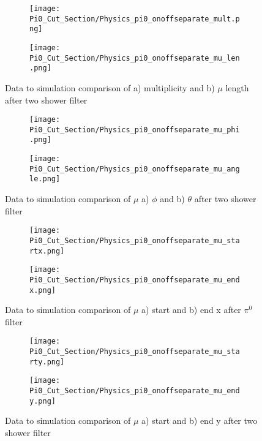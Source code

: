 \begin{figure}[H]
  \begin{subfigure}[t]{0.3\textwidth}
\texttt{[image: Pi0\_Cut\_Section/Physics\_pi0\_onoffseparate\_mult.png]}
  \caption{ }
  \end{subfigure} 
  \hspace{34mm}
  \begin{subfigure}[t]{0.3\textwidth}
    \texttt{[image: Pi0\_Cut\_Section/Physics\_pi0\_onoffseparate\_mu\_len.png]}
  \caption{ }
  \end{subfigure} 
  \caption{ Data to simulation comparison of a) multiplicity and b) $\mu$ length after two shower filter }
\label{fig:physics_pi0_mu_len}
\end{figure}

\begin{figure}[H]
  \begin{subfigure}[t]{0.3\textwidth}
\texttt{[image: Pi0\_Cut\_Section/Physics\_pi0\_onoffseparate\_mu\_phi.png]}
  \caption{ }
  \end{subfigure} 
  \hspace{34mm}
  \begin{subfigure}[t]{0.3\textwidth}
\texttt{[image: Pi0\_Cut\_Section/Physics\_pi0\_onoffseparate\_mu\_angle.png]}
  \caption{ }
  \end{subfigure} 
\caption{ Data to simulation comparison of $\mu$ a) $\phi$ and b) $\theta$ after two shower filter }

\label{fig:physics_pi0_mu_phi}
\end{figure}

\begin{figure}[H]
  \begin{subfigure}[t]{0.3\textwidth}
\texttt{[image: Pi0\_Cut\_Section/Physics\_pi0\_onoffseparate\_mu\_startx.png]}
  \caption{ }
  \end{subfigure} 
  \hspace{34mm}
  \begin{subfigure}[t]{0.3\textwidth}
\texttt{[image: Pi0\_Cut\_Section/Physics\_pi0\_onoffseparate\_mu\_endx.png]}
  \caption{ }
  \end{subfigure} 
\caption{ Data to simulation comparison of $\mu$ a) start and b) end x after $\pi^0$ filter }
\label{fig:physics_pi0_mu_x}
\end{figure}

\begin{figure}[H]
  \begin{subfigure}[t]{0.3\textwidth}
\texttt{[image: Pi0\_Cut\_Section/Physics\_pi0\_onoffseparate\_mu\_starty.png]}
  \caption{ }
  \end{subfigure} 
  \hspace{34mm}
  \begin{subfigure}[t]{0.3\textwidth}
\texttt{[image: Pi0\_Cut\_Section/Physics\_pi0\_onoffseparate\_mu\_endy.png]}
  \caption{ }
  \end{subfigure} 
\caption{ Data to simulation comparison of $\mu$ a) start and b) end y after two shower filter }
\label{fig:physics_pi0_mu_y}
\end{figure}

